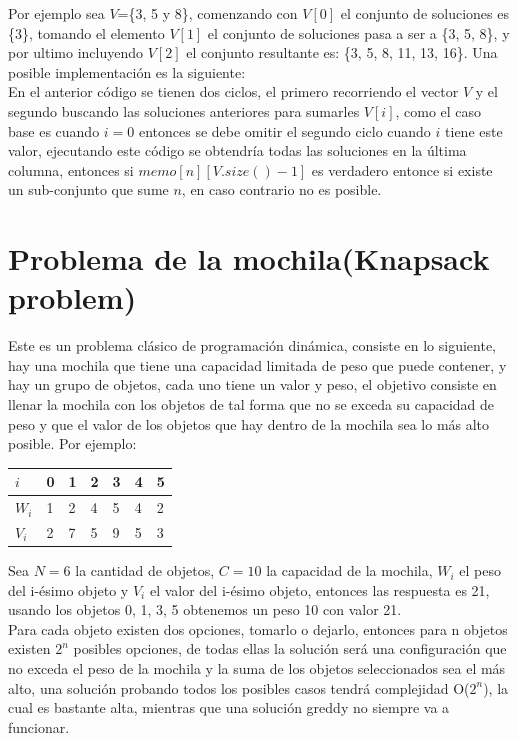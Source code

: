 \documentclass[12pt, a4paper]{article}
\newcommand\cppfile[2][]{

}
\begin{document}
	Por ejemplo sea $V$=\{3, 5 y 8\}, comenzando con $V[0]$ el conjunto de soluciones es \{3\}, tomando el elemento
	$V[1]$ el conjunto de soluciones pasa a ser a \{3, 5, 8\}, y por ultimo incluyendo $V[2]$ el conjunto resultante  
	es: \{3, 5, 8, 11, 13, 16\}. Una posible implementación es la siguiente:\\
	\cppfile[8-21]{Programacion_dinamica/codigos/SubSetSum.cpp}
	
	En el anterior código se tienen dos ciclos, el primero recorriendo el vector $V$ y el segundo buscando las 
	soluciones anteriores para sumarles $V[i]$, como el caso base es cuando $i=0$ entonces se debe omitir el segundo
	ciclo cuando $i$ tiene este valor, ejecutando este código se obtendría todas las soluciones en la última columna,
	entonces si $memo[n][V.size()-1]$ es verdadero entonce si existe un sub-conjunto que sume $n$, en caso contrario
	no es posible.

	\section{Problema de la mochila(Knapsack problem)}
	\label{dp:problema_de_la_mochila}
	
	Este es un problema clásico de programación dinámica, consiste en lo siguiente, hay una mochila que tiene una
	capacidad limitada de peso que puede contener, y hay un grupo de objetos, cada uno tiene un valor y peso, el
	objetivo consiste en llenar la mochila con los objetos de tal forma que no se exceda su capacidad de peso y 
	que el valor de los objetos que hay dentro de la mochila sea lo más alto posible. Por ejemplo:
	\begin{center}
		\begin{tabular}{|l|l|l|l|l|l|l|}
			\hline
			$i$  	&0 &1 &2 &3 &4 &5 \\ \hline
			$W_{i}$ &1 &2 &4 &5 &4 &2 \\ \hline
			$V_{i}$ &2 &7 &5 &9 &5 &3 \\ \hline
		\end{tabular}
	\end{center}
	Sea $N=6$ la cantidad de objetos, $C=10$ la capacidad de la mochila, $W_{i}$ el peso del i-ésimo objeto y 
	$V_{i}$ el valor del i-ésimo objeto, entonces las respuesta es 21, usando los objetos 0, 1, 3, 5 obtenemos un peso 
	10 con valor 21.\\
	
	Para cada objeto existen dos opciones, tomarlo o dejarlo, entonces para n objetos existen $2^{n}$ posibles 
	opciones, de todas ellas la solución será una configuración que no exceda el peso de la mochila y la suma de los
	objetos seleccionados sea el más alto, una solución probando todos los posibles casos tendrá complejidad 
	O($2^{n}$), la cual es bastante alta, mientras que una solución greddy no siempre va a funcionar.\\
\end{document}
